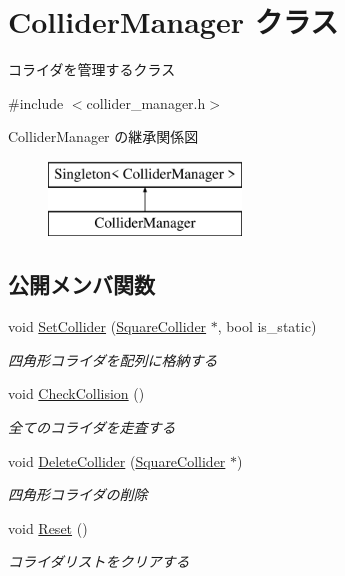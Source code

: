 \hypertarget{class_collider_manager}{}\section{Collider\+Manager クラス}
\label{class_collider_manager}


コライダを管理するクラス  




{\ttfamily \#include $<$collider\+\_\+manager.\+h$>$}

Collider\+Manager の継承関係図\begin{figure}[H]
\begin{center}
\leavevmode
\includegraphics[height=2.000000cm]{class_collider_manager}
\end{center}
\end{figure}
\subsection*{公開メンバ関数}
\begin{DoxyCompactItemize}
\item 
void \mbox{\hyperlink{class_collider_manager_acf6822be802b18cd2f0ea50b2ba00d63}{Set\+Collider}} (\mbox{\hyperlink{class_square_collider}{Square\+Collider}} $\ast$, bool is\+\_\+static)
\begin{DoxyCompactList}\small\item\em 四角形コライダを配列に格納する \end{DoxyCompactList}\item 
void \mbox{\hyperlink{class_collider_manager_af3863143e206b4c86c8b89dd91ff3c8c}{Check\+Collision}} ()
\begin{DoxyCompactList}\small\item\em 全てのコライダを走査する \end{DoxyCompactList}\item 
void \mbox{\hyperlink{class_collider_manager_afb805cdb8c6e5872d54ecbb9368ba38d}{Delete\+Collider}} (\mbox{\hyperlink{class_square_collider}{Square\+Collider}} $\ast$)
\begin{DoxyCompactList}\small\item\em 四角形コライダの削除 \end{DoxyCompactList}\item 
void \mbox{\hyperlink{class_collider_manager_a6d397c24cd8fdac77685d71842b8ae2e}{Reset}} ()
\begin{DoxyCompactList}\small\item\em コライダリストをクリアする \end{DoxyCompactList}\end{DoxyCompactItemize}
